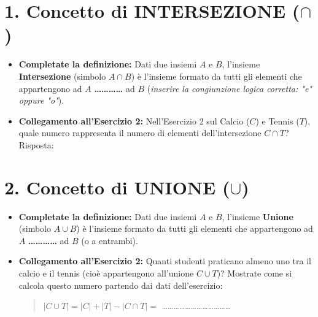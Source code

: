 \documentclass[11pt, a4paper]{article}
\begin{document}
\section*{1. Concetto di INTERSEZIONE ($\cap$)}
\begin{itemize}
    \item \textbf{Completate la definizione:} Dati due insiemi $A$ e $B$, l'insieme \textbf{Intersezione} (simbolo $A \cap B$) è l'insieme formato da tutti gli elementi che appartengono ad $A$ \textbf{\dots\dots\dots\dots} ad $B$ (\textit{inserire la congiunzione logica corretta: "e" oppure "o"}).
    \item \textbf{Collegamento all'Esercizio 2:} Nell'Esercizio 2 sul Calcio ($C$) e Tennis ($T$), quale numero rappresenta il numero di elementi dell'intersezione $C \cap T$? Risposta: \dotfill
\end{itemize}

\vspace{-1mm}

\section*{2. Concetto di UNIONE ($\cup$)}
\begin{itemize}
    \item \textbf{Completate la definizione:} Dati due insiemi $A$ e $B$, l'insieme \textbf{Unione} (simbolo $A \cup B$) è l'insieme formato da tutti gli elementi che appartengono ad $A$ \textbf{\dots\dots\dots\dots} ad $B$ (o a entrambi).
    \item \textbf{Collegamento all'Esercizio 2:} Quanti studenti praticano almeno uno tra il calcio e il tennis (cioè appartengono all'unione $C \cup T$)? Mostrate come si calcola questo numero partendo dai dati dell'esercizio:
    \begin{quote}
    $|C \cup T| = |C| + |T| - |C \cap T| = $ \dots\dots\dots\dots\dots\dots\dots\dots\dots\dots\dots\dots
    \end{quote}
\end{itemize}

\vspace{-1mm}
\end{document}
